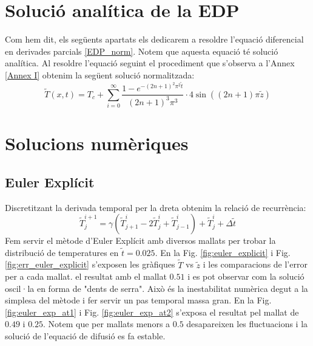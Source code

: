 \documentclass{article}
\begin{document}
\section{Solució analítica de la EDP}
Com hem dit, els següents apartats els dedicarem a resoldre l'equació diferencial en derivades parcials \eqref{EDP_norm}. Notem que aquesta equació té solució analítica. Al resoldre l'equació seguint el procediment que s'observa a l'Annex \ref{Annex I} obtenim la següent solució normalitzada:
\begin{equation*}
    \tilde{T}(x,t) = T_c + \sum_{i=0}^{\infty} \frac{ 1-e^{-(2n+1)^2 \pi^2 \tilde{t}}}{(2n+1)^3\pi^3}\cdot 4\sin((2n+1)\pi \tilde{z})
\end{equation*}

\section{Solucions numèriques}
\subsection{Euler Explícit}
Discretitzant la derivada temporal per la dreta obtenim la relació de recurrència:
\begin{equation*}
    \tilde{T}_{j}^{i+1} = \gamma (\tilde{T}_{j+1}^{i}-2\tilde{T}_{j}^{i}+\tilde{T}_{j-1}^{i}) + \tilde{T}_{j}^{i} + \Delta \tilde{t}
\end{equation*}
Fem servir el mètode d'Euler Explícit \cite{Navau2024} amb diversos mallats per trobar la distribució de temperatures en $\tilde{t}=0.025$. En la Fig. \ref{fig:euler_explicit} i Fig. \ref{fig:err_euler_explicit} s'exposen les gràfiques $\tilde{T}$ vs $\tilde{z}$ i les comparacions de l'error per a cada mallat. el resultat amb el mallat $0.51$ i es pot observar com la solució oscil·la en forma de "dents de serra". Això és la inestabilitat numèrica degut a la simplesa del mètode i fer servir un pas temporal massa gran.  En la Fig. \ref{fig:euler_exp_at1} i Fig. \ref{fig:euler_exp_at2} s'exposa el resultat pel mallat de $0.49$ i $0.25$. Notem que per mallats menors a $0.5$ desapareixen les fluctuacions i la solució de l'equació de difusió es fa estable.
\end{document}
